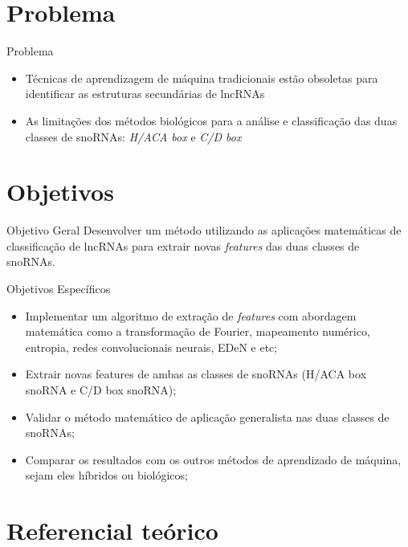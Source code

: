 \documentclass{apresentacao-ifb}
\begin{document}
\section{Problema}
 
\begin{frame}{Problema}
	\begin{itemize}
	    \item Técnicas de aprendizagem de máquina tradicionais estão obsoletas para identificar as estruturas secundárias de lncRNAs
            \item As limitações dos métodos biológicos para a análise e classificação das duas classes de snoRNAs: \textit{H/ACA box} e \textit{C/D box}
	\end{itemize}
\end{frame}

\section{Objetivos}

\begin{frame}{Objetivo Geral}
	Desenvolver um método utilizando as aplicações matemáticas de classificação de lncRNAs para extrair novas \textit{features} das duas classes de snoRNAs.
\end{frame}

\begin{frame}{Objetivos Específicos}
	 \begin{itemize}
    \item Implementar um algoritmo de extração de \textit{features} com abordagem matemática como a transformação de Fourier, mapeamento numérico, entropia, redes convolucionais neurais, EDeN e etc;
    \item Extrair novas features de ambas as classes de snoRNAs (H/ACA box snoRNA e C/D box snoRNA);
    \item Validar o método matemático de aplicação generalista nas duas classes de snoRNAs;
    \item Comparar os resultados com os outros métodos de aprendizado de máquina, sejam eles híbridos ou biológicos;
\end{itemize}
\end{frame}

\section{Referencial teórico}
\end{document}
